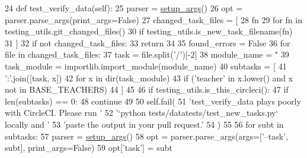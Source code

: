 \begin{DoxyCode}
24     \textcolor{keyword}{def }test\_verify\_data(self):
25         parser = \hyperlink{namespaceparlai_1_1chat__service_1_1services_1_1messenger_1_1run_a17bafea2534d593de1fbf1e0724e5b67}{setup\_args}()
26         opt = parser.parse\_args(print\_args=\textcolor{keyword}{False})
27         changed\_task\_files = [
28             fn
29             \textcolor{keywordflow}{for} fn \textcolor{keywordflow}{in} testing\_utils.git\_changed\_files()
30             \textcolor{keywordflow}{if} testing\_utils.is\_new\_task\_filename(fn)
31         ]
32         \textcolor{keywordflow}{if} \textcolor{keywordflow}{not} changed\_task\_files:
33             \textcolor{keywordflow}{return}
34 
35         found\_errors = \textcolor{keyword}{False}
36         \textcolor{keywordflow}{for} file \textcolor{keywordflow}{in} changed\_task\_files:
37             task = file.split(\textcolor{stringliteral}{'/'})[-2]
38             module\_name = \textcolor{stringliteral}{"%
39             task\_module = importlib.import\_module(module\_name)
40             subtasks = [
41                 \textcolor{stringliteral}{':'}.join([task, x])
42                 \textcolor{keywordflow}{for} x \textcolor{keywordflow}{in} dir(task\_module)
43                 \textcolor{keywordflow}{if} (\textcolor{stringliteral}{'teacher'} \textcolor{keywordflow}{in} x.lower() \textcolor{keywordflow}{and} x \textcolor{keywordflow}{not} \textcolor{keywordflow}{in} BASE\_TEACHERS)
44             ]
45 
46             \textcolor{keywordflow}{if} testing\_utils.is\_this\_circleci():
47                 \textcolor{keywordflow}{if} len(subtasks) == 0:
48                     \textcolor{keywordflow}{continue}
49 
50                 self.fail(
51                     \textcolor{stringliteral}{'test\_verify\_data plays poorly with CircleCI. Please run '}
52                     \textcolor{stringliteral}{'`python tests/datatests/test\_new\_tasks.py` locally and '}
53                     \textcolor{stringliteral}{'paste the output in your pull request.'}
54                 )
55 
56             \textcolor{keywordflow}{for} subt \textcolor{keywordflow}{in} subtasks:
57                 parser = \hyperlink{namespaceparlai_1_1chat__service_1_1services_1_1messenger_1_1run_a17bafea2534d593de1fbf1e0724e5b67}{setup\_args}()
58                 opt = parser.parse\_args(args=[\textcolor{stringliteral}{'--task'}, subt], print\_args=\textcolor{keyword}{False})
59                 opt[\textcolor{stringliteral}{'task'}] = subt
}
\end{DoxyCode}
